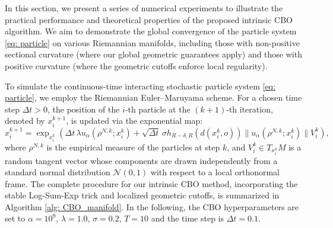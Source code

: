\documentclass[11pt]{amsart}
\newcommand{\p}{o}%
\newcommand{\dist}{d}%
\begin{document}
In this section, we present a series of numerical experiments to illustrate the practical performance and theoretical properties of the proposed intrinsic CBO algorithm. We aim to demonstrate the global convergence of the particle system \eqref{eq: particle} on various Riemannian manifolds, including those with non-positive sectional curvature (where our global geometric guarantees apply) and those with positive curvature (where the geometric cutoffs enforce local regularity). 

To simulate the continuous-time interacting stochastic particle system \eqref{eq: particle}, we employ the Riemannian Euler--Maruyama scheme. For a chosen time step $\Delta t > 0$, the position of the $i$-th particle at the $(k+1)$-th iteration, denoted by $x_i^{k+1}$, is updated via the exponential map:
\begin{equation*}
    x_i^{k+1} = \exp_{x_i^k} \left( \Delta t \, \lambda u_\alpha(\rho^{N, k}; x_i^k) + \sqrt{\Delta t} \, \sigma h_{R-\delta, R}(\dist(x_i^k, \p)) \|u_\alpha(\rho^{N, k}; x_i^k)\| V_i^k \right),
\end{equation*}
where $\rho^{N, k}$ is the empirical measure of the particles at step $k$, and $V_i^k \in T_{x_i^k}M$ is a random tangent vector whose components are drawn independently from a standard normal distribution $\mathcal{N}(0,1)$ with respect to a local orthonormal frame.  The complete procedure for our intrinsic CBO method, incorporating the stable Log-Sum-Exp trick and localized geometric cutoffs, is summarized in Algorithm \ref{alg: CBO_manifold}.  In the following, the CBO hyperparameters are set to $\alpha = 10^9$, $\lambda = 1.0$, $\sigma = 0.2$, $T=10$ and the time step is $\Delta t = 0.1$.
\end{document}
